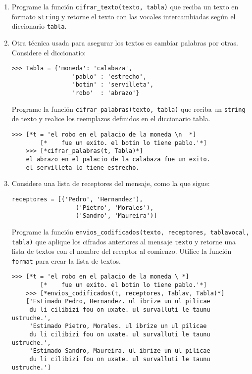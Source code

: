   \begin{enumerate}
  \item
    Programe la función
    \texttt{cifrar\_texto(texto, tabla)}
    que reciba un texto en formato
    \texttt{string} y
    retorne el texto con las vocales intercambiadas
    según el diccionario \texttt{tabla}.
  \item
    Otra técnica usada para asegurar los textos es
    cambiar palabras por otras.
    Considere el diccionatio:
    
    \begin{lstlisting}[style=consola]
    >>> Tabla = {'moneda': 'calabaza',
                 'pablo' : 'estrecho',
                 'botin' : 'servilleta',
                 'robo'  : 'abrazo'}
    \end{lstlisting}
    
    Programe la función
    \texttt{cifrar\_palabras(texto, tabla)}
    que reciba un \texttt{string} de texto
    y realice los reemplazos definidos en el diccionario tabla.
    
    \begin{lstlisting}[style=consola]
    >>> [*t = 'el robo en el palacio de la moneda \n  *]
        [*    fue un exito. el botin lo tiene pablo.'*]
    >>> [*cifrar_palabras(t, Tabla)*]
    el abrazo en el palacio de la calabaza fue un exito.
    el servilleta lo tiene estrecho.
    \end{lstlisting}
  \item
    Considere una lista de receptores del mensaje,
    como la que sigue:
    
    \begin{lstlisting}[style=consola]
    receptores = [('Pedro', 'Hernandez'),
                  ('Pietro', 'Morales'),
                  ('Sandro', 'Maureira')]
    \end{lstlisting}
    
    Programe la función
    \texttt{envios\_codificados(texto, receptores, tablavocal, tabla)}
    que aplique los cifrados anteriores al mensaje \texttt{texto}
    y retorne una lista de textos con el nombre del receptor
    al comienzo.
    Utilice la función \texttt{format} para crear la lista de textos.
    
    \begin{lstlisting}[style=consola]
    >>> [*t = 'el robo en el palacio de la moneda \ *]
        [*    fue un exito. el botin lo tiene pablo.'*]
    >>> [*envios_codificados(t, receptores, Tablav, Tabla)*]
    ['Estimado Pedro, Hernandez. ul ibrize un ul pilicae
     du li cilibizi fou on uxate. ul survalluti le taunu ustruche.',
     'Estimado Pietro, Morales. ul ibrize un ul pilicae
     du li cilibizi fou on uxate. ul survalluti le taunu ustruche.', 
     'Estimado Sandro, Maureira. ul ibrize un ul pilicae 
     du li cilibizi fou on uxate. ul survalluti le taunu ustruche.']
    \end{lstlisting}
  \end{enumerate}
  
  \pagebreak[4]